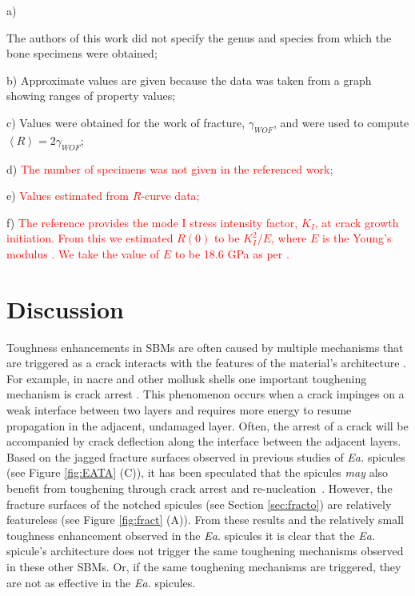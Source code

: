 \documentclass[12pt,onecolumn]{article}
\makeatletter
\newcommand{\EA}{\textit{Ea.\@}\xspace}
\makeatother
\begin{document}
\begin{bibunit}
\begin{table}
\begin{threeparttable}[t]
\begin{tabular}{llll}
\bottomrule
\end{tabular}
\begin{tablenotes}
\item[a)] {\footnotesize The authors of this work did not specify the genus and species from which the bone specimens were obtained;
\item[b)] Approximate values are given because the data was taken from a graph showing ranges of property values;
\item[c)] Values were obtained for the work of fracture, $\gamma_{WOF}$, and were used to compute $\left< R\right>=2\gamma_{WOF}$;
\item[d)] \textcolor{red}{The number of specimens was not given in the referenced work;}
\item[e)] \textcolor{red}{Values estimated from $R$-curve data;}
\item[f)] \textcolor{red}{The reference provides the mode I stress intensity factor, $K_I$, at crack growth initiation. From this we estimated $R(0)$ to be $K_I^2/E$, where $E$ is the Young's modulus \cite{koester2008true}. We take the value of $E$ to be 18.6 GPa as per \cite{rho1993young}.}  
}
\end{tablenotes}
\end{threeparttable}
\end{table}

\section{Discussion}
\label{sec:discussion}
Toughness enhancements in SBMs are often caused by multiple mechanisms that are triggered as a crack interacts with the features of the material's architecture \cite{barthelat2007experimental,currey1977,launey2009fracture}. For example, in nacre and other mollusk shells one important toughening mechanism is crack arrest \cite{jackson1988mechanical,currey1977,kamat2000structural}. This phenomenon occurs when a crack impinges on a weak interface between two layers and requires more energy to resume propagation in the adjacent, undamaged layer. Often, the arrest of a crack will be accompanied by crack deflection along the interface between the adjacent layers. Based on the jagged fracture surfaces observed in previous studies of \EA spicules (see Figure \ref{fig:EATA} (C)), it has been speculated that the spicules \emph{may} also benefit from toughening through crack arrest and re-nucleation~\cite{mayer2011new,walter2007mechanisms}. However, the fracture surfaces of the notched spicules (see Section \ref{sec:fracto}) are relatively featureless (see Figure \ref{fig:fract} (A)). From these results and the relatively small toughness enhancement observed in the \EA spicules it is clear that the \EA spicule's architecture does not trigger the same toughening mechanisms observed in these other SBMs. Or, if the same toughening mechanisms are triggered, they are not as effective in the \EA spicules.


\end{bibunit}
\end{document}
